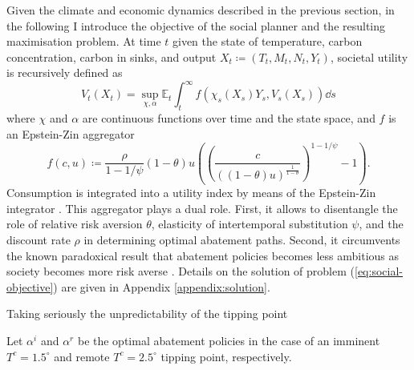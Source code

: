 \documentclass[../../main.tex]{subfiles}
\begin{document}
Given the climate and economic dynamics described in the previous section, in the following I introduce the objective of the social planner and the resulting maximisation problem. At time $t$ given the state of temperature, carbon concentration, carbon in sinks, and output $X_t \coloneqq (T_t, M_t, N_t, Y_t)$, societal utility is recursively defined as \begin{equation} \label{eq:social-objective}
    V_t(X_t) = \sup_{\chi, \alpha} \mathbb{E}_t 
    \int_{t}^{\infty} f(\chi_s(X_s) Y_s, V_s(X_s)) \dd{s}
\end{equation} where $\chi$ and $\alpha$ are continuous functions over time and the state space, and $f$ is an Epstein-Zin aggregator \begin{equation} \label{eq:aggregator}
    f(c, u) \coloneqq \frac{\rho}{1 - 1 / \psi} (1 - \theta) u  \left( \left(\frac{c}{((1 - \theta) u)^{\frac{1}{1 - \theta}}}\right)^{1 - 1 / \psi} - 1 \right).
\end{equation} Consumption is integrated into a utility index by means of the Epstein-Zin integrator \citep{duffie_asset_1992}. This aggregator plays a dual role. First, it allows to disentangle the role of relative risk aversion $\theta$, elasticity of intertemporal substitution $\psi$, and the discount rate $\rho$ in determining optimal abatement paths. Second, it circumvents the known paradoxical result that abatement policies becomes less ambitious as society becomes more risk averse \citep{pindyck_economic_2013}. Details on the solution of problem (\ref{eq:social-objective}) are given in Appendix \ref{appendix:solution}. 

Taking seriously the unpredictability of the tipping point 

Let $\alpha^{i}$ and $\alpha^{r}$ be the optimal abatement policies in the case of an imminent $T^c = 1.5^\circ$ and remote $T^c = 2.5^\circ$ tipping point, respectively.
\end{document}
